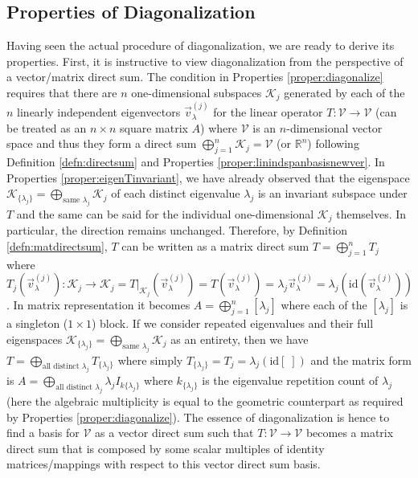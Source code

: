 \subsection{Properties of Diagonalization}

Having seen the actual procedure of diagonalization, we are ready to derive its properties. First, it is instructive to view diagonalization from the perspective of a vector/matrix direct sum. The condition in Properties \ref{proper:diagonalize} requires that there are $n$ one-dimensional subspaces $\mathcal{K}_j$ generated by each of the $n$ linearly independent eigenvectors $\vec{v}_\lambda^{(j)}$ for the linear operator $T: \mathcal{V} \to \mathcal{V}$ (can be treated as an $n \times n$ square matrix $A$) where $\mathcal{V}$ is an $n$-dimensional vector space and thus they form a direct sum $\bigoplus_{j=1}^n \mathcal{K}_j = \mathcal{V}$ (or $\mathbb{R}^n$) following Definition \ref{defn:directsum} and Properties \ref{proper:linindspanbasisnewver}. In Properties \ref{proper:eigenTinvariant}, we have already observed that the eigenspace $\mathcal{K}_{\{\lambda_j\}} = \bigoplus_{\text{same }\lambda_j} \mathcal{K}_j$ of each distinct eigenvalue $\lambda_j$ is an invariant subspace under $T$ and the same can be said for the individual one-dimensional $\mathcal{K}_j$ themselves. In particular, the direction remains unchanged. Therefore, by Definition \ref{defn:matdirectsum}, $T$ can be written as a matrix direct sum $T = \bigoplus_{j=1}^n T_j$ where $T_j(\vec{v}_\lambda^{(j)}): \mathcal{K}_j \to \mathcal{K}_j = T|_{\mathcal{K}_j}(\vec{v}_\lambda^{(j)}) = T(\vec{v}_\lambda^{(j)}) = \lambda_j\vec{v}_\lambda^{(j)} = \lambda_j(\text{id}(\vec{v}_\lambda^{(j)}))$. In matrix representation it becomes $A = \bigoplus_{j=1}^n [\lambda_j]$ where each of the $[\lambda_j]$ is a singleton ($1 \times 1$) block. If we consider repeated eigenvalues and their full eigenspaces $\mathcal{K}_{\{\lambda_j\}} = \bigoplus_{\text{same }\lambda_j} \mathcal{K}_j$ as an entirety, then we have $T = \bigoplus_{\text{all distinct }\lambda_j} T_{\{\lambda_j\}}$ where simply $T_{\{\lambda_j\}} = T_j = \lambda_j(\text{id}[\;])$ and the matrix form is $A = \bigoplus_{\text{all distinct }\lambda_j} \lambda_j I_{k\{\lambda_j\}}$ where $k_{\{\lambda_j\}}$ is the eigenvalue repetition count of $\lambda_j$ (here the algebraic multiplicity is equal to the geometric counterpart as required by Properties \ref{proper:diagonalize}). The essence of diagonalization is hence to find a basis for $\mathcal{V}$ as a vector direct sum such that $T: \mathcal{V} \to \mathcal{V}$ becomes a matrix direct sum that is composed by some scalar multiples of identity matrices/mappings with respect to this vector direct sum basis.

